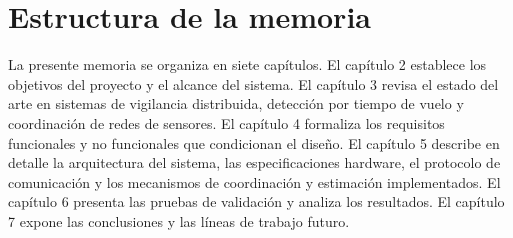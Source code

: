 \section{Estructura de la memoria}

La presente memoria se organiza en siete capítulos. El capítulo 2 establece los objetivos del proyecto y el alcance del sistema. El capítulo 3 revisa el estado del arte en sistemas de vigilancia distribuida, detección por tiempo de vuelo y coordinación de redes de sensores. El capítulo 4 formaliza los requisitos funcionales y no funcionales que condicionan el diseño. El capítulo 5 describe en detalle la arquitectura del sistema, las especificaciones hardware, el protocolo de comunicación y los mecanismos de coordinación y estimación implementados. El capítulo 6 presenta las pruebas de validación y analiza los resultados. El capítulo 7 expone las conclusiones y las líneas de trabajo futuro.
